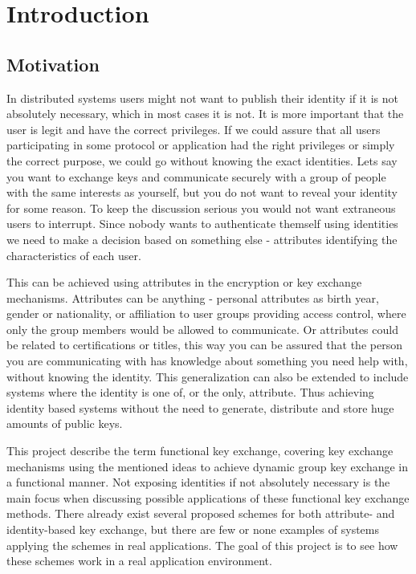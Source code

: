 \chapter{Introduction}
\label{chp:intro} 
\section{Motivation}
In distributed systems users might not want to publish their identity if it is not absolutely necessary, which in most cases it is not. It is more important that the user is legit and have the correct privileges. If we could assure that all users participating in some protocol or application had the right privileges or simply the correct purpose, we could go without knowing the exact identities. Lets say you want to exchange keys and communicate securely with a group of people with the same interests as yourself, but you do not want to reveal your identity for some reason. To keep the discussion serious you would not want extraneous users to interrupt. Since nobody wants to authenticate themself using identities we need to make a decision based on something else - attributes identifying the characteristics of each user.
 \par This can be achieved using attributes in the encryption or key exchange mechanisms. Attributes can be anything - personal attributes as birth year, gender or nationality, or affiliation to user groups providing access control, where only the group members would be allowed to communicate. Or attributes could be related to certifications or titles, this way you can be assured that the person you are communicating with has knowledge about something you need help with, without knowing the identity. This generalization can also be extended to include systems where the identity is one of, or the only, attribute. Thus achieving identity based systems without the need to generate, distribute and store huge amounts of public keys. 
\par This project describe the term functional key exchange, covering key exchange mechanisms using the mentioned ideas to achieve dynamic group key exchange in a functional manner. Not exposing identities if not absolutely necessary is the main focus when discussing possible applications of these functional key exchange methods. There already exist several proposed schemes for both attribute- and identity-based key exchange, but there are few or none examples of systems applying the schemes in real applications. The goal of this project is to see how these schemes work in a real application environment.

